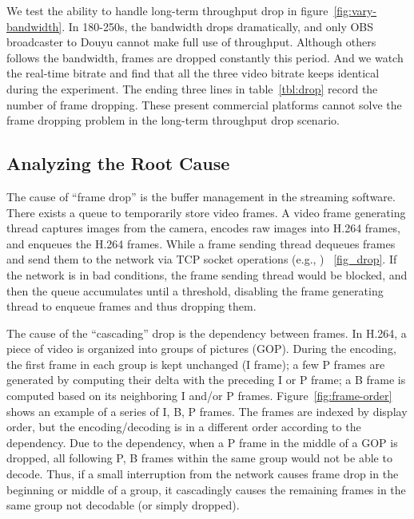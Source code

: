 We test the ability to handle long-term throughput drop in figure~\ref{fig:vary-bandwidth}. In 180-250s, the bandwidth drops dramatically, and only OBS broadcaster to Douyu cannot make full use of throughput. Although others follows the bandwidth, frames are dropped constantly this period. And we watch the real-time bitrate and find that all the three video bitrate keeps identical during the experiment. The ending three lines in table~\ref{tbl:drop} record the number of frame dropping. These present commercial platforms cannot solve the frame dropping problem in the long-term throughput drop scenario.

\subsection{Analyzing the Root Cause}


The cause of ``frame drop'' is the buffer management in the streaming software. There exists a queue to temporarily store video frames. A video frame generating thread captures images from the camera, encodes raw images into H.264 frames, and enqueues the H.264 frames. While a frame sending thread dequeues frames and send them to the network via TCP socket operations (e.g., \mywrite) ~\ref{fig_drop}.
If the network is in bad conditions, the frame sending thread would be blocked, and then the queue accumulates until a threshold, disabling the frame generating thread to enqueue frames and thus dropping them.



The cause of the ``cascading'' drop is the dependency between frames. In H.264, a piece of video is organized into groups of pictures (GOP). During the encoding, the first frame in each group is kept unchanged (I frame); a few P frames are generated by computing their delta with the preceding I or P frame; a B frame is computed based on its neighboring I and/or P frames. Figure~\ref{fig:frame-order} shows an example of a series of I, B, P frames. The frames are indexed by display order, but the encoding/decoding is in a different order according to the dependency. Due to the dependency, when a P frame in the middle of a GOP is dropped, all following P, B frames within the same group would not be able to decode. Thus, if a small interruption from the network causes frame drop in the beginning or middle of a group, it cascadingly causes the remaining frames in the same group not decodable (or simply dropped).


